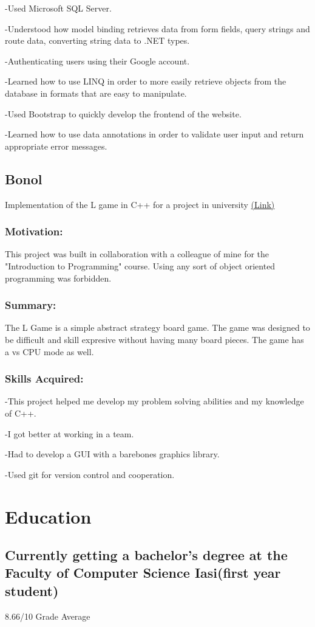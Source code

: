 \documentclass[a4paper,hidelinks,12pt]{article}
\begin{document}
-Used Microsoft SQL Server.  

-Understood how model binding retrieves data from form fields, query strings and route data, converting string
data to .NET types.

-Authenticating users using their Google account.

-Learned how to use LINQ in order to more easily retrieve objects from the database in formats that are easy
to manipulate.

-Used Bootstrap to quickly develop the frontend of the website.

-Learned how to use data annotations in order to validate user input and return appropriate error messages.


\subsection{Bonol}
Implementation of the L game in C++ for a project in university \href{https://github.com/IureaMarius/ProiectIP}{(Link)}
\subsubsection{Motivation:}
This project was built in collaboration with a colleague of mine for the "Introduction to Programming" course.
Using any sort of object oriented programming was forbidden.
\subsubsection{Summary:}
The L Game is a simple abstract strategy board game. The game was designed to be difficult and skill expresive
without having many board pieces. The game has a vs CPU mode as well.
\subsubsection{Skills Acquired:}
-This project helped me develop my problem solving abilities and my knowledge of C++.

-I got better at working in a team.

-Had to develop a GUI with a barebones graphics library.

-Used git for version control and cooperation.
\section{Education}
\subsection{Currently getting a bachelor's degree at 
the Faculty of Computer Science Iasi(first year student)}
 8.66/10 Grade Average
\end{document}
